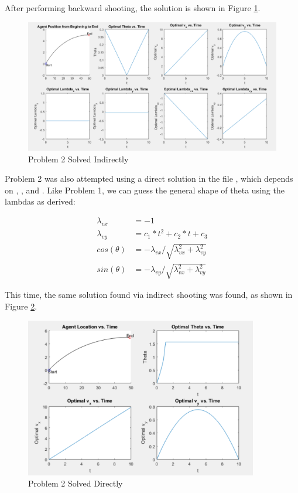\documentclass[12pt,letterpaper]{article}
\begin{document}
After performing backward shooting, the solution is shown in Figure \ref{fig:prob2indirect}.


\clearpage


\begin{figure}[!h]
\centering
\includegraphics[width=6in]{prob2indirect.png}
\caption{Problem 2 Solved Indirectly}
\label{fig:prob2indirect}
\end{figure}

Problem 2 was also attempted using a direct solution in the file , which depends on , , and . Like Problem 1, we can guess the general shape of theta using the lambdas as derived: 

\begin{equation}
\begin{aligned}
\label{eq:2}
\lambda_{vx} &= -1 \\
\lambda_{vy} &= c_1*t^2 + c_2*t + c_3  \\
cos(\theta) &= -\lambda_{vx} / \sqrt{\lambda_{vx}^2 + \lambda_{vy}^2} \\
sin(\theta) &= -\lambda_{vy} / \sqrt{\lambda_{vx}^2 + \lambda_{vy}^2}
\end{aligned}
\end{equation}

This time, the same solution found via indirect shooting was found, as shown in Figure \ref{fig:prob2direct}.


\clearpage



\begin{figure}[!h]
\centering
\includegraphics[width=4in]{prob2direct.png}
\caption{Problem 2 Solved Directly}
\label{fig:prob2direct}
\end{figure}
\end{document}
